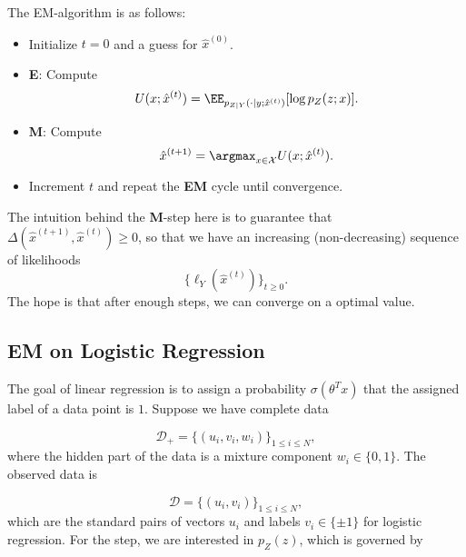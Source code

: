 The EM-algorithm is as follows: 
\begin{itemize}
	\item Initialize $t=0$ and a guess for $\hat{x}^{(0)}$. 
	\item \textbf{E}: Compute 
		\[U(x;\hat{x}^{(t)}) = \EE_{p_{Z|Y}(\cdot | y; \hat{x}^{(t)})}[\log p_Z(z;x)].\] 
	\item \textbf{M}: Compute 
		\[\hat{x}^{(t+1)} = \argmax_{x\in \mathcal{X}}U(x; \hat{x}^{(t)}).\]
	\item Increment $t$ and repeat the \textbf{EM} cycle until convergence. 
\end{itemize}
The intuition behind the \textbf{M}-step here is to guarantee that $\Delta(\hat{x}^{(t+1)}, \hat{x}^{(t)}) \geq 0$, so that we have an increasing (non-decreasing) sequence of likelihoods 
\[\{\ell_Y(\hat{x}^{(t)})\}_{t\geq 0}.\] 
The hope is that after enough steps, we can converge on a optimal value. 

\subsection{EM on Logistic Regression}

The goal of linear regression is to assign a probability $\sigma(\theta^Tx)$ that the assigned label of a data point is $1$. Suppose we have complete data 

\[\mathcal{D}_+ = \{(u_i,v_i,w_i)\}_{1\leq i\leq N},\] 
where the hidden part of the data is a mixture component $w_i\in \{0,1\}$. The observed data is 

\[\mathcal{D} = \{(u_i,v_i)\}_{1\leq i\leq N},\]
which are the standard pairs of vectors $u_i$ and labels $v_i\in \{\pm 1\}$ for logistic regression. For the  step, we are interested in $p_Z(z)$, which is governed by

